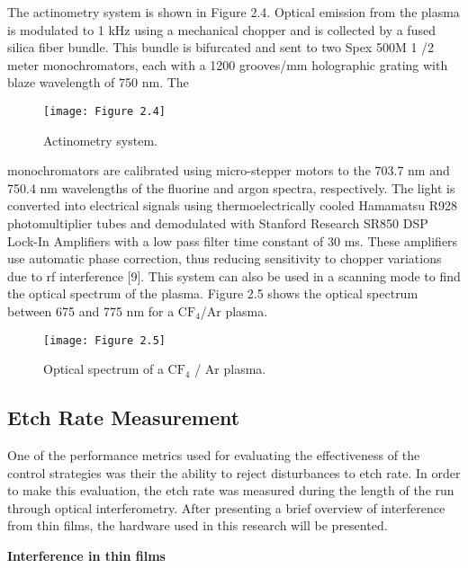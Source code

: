 The actinometry system is shown in Figure 2.4. Optical emission from the plasma is
modulated to 1 kHz using a mechanical chopper and is collected by a fused silica fiber
bundle. This bundle is bifurcated and sent to two Spex 500M 1 /2 meter monochromators,
each with a 1200 grooves/mm holographic grating with blaze wavelength of 750 nm. The


\begin{figure}[H]
	\centering
	\texttt{[image: Figure 2.4]}
	\bf\caption{ Actinometry system.}
	\label{fig:2.4}
\end{figure}


\noindent monochromators are calibrated using micro-stepper motors to the 703.7 nm and 750.4 nm
wavelengths of the fluorine and argon spectra, respectively. The light is converted into
electrical signals using thermoelectrically cooled Hamamatsu R928 photomultiplier tubes
and demodulated with Stanford Research SR850 DSP Lock-In Amplifiers with a low pass
filter time constant of 30 ms. These amplifiers use automatic phase correction, thus reducing
sensitivity to chopper variations due to rf interference [9]. This system can also be used in
a scanning mode to find the optical spectrum of the plasma. Figure 2.5 shows the optical
spectrum between 675 and 775 nm for a $\text{CF}_{4}$/Ar plasma.

\begin{figure}[H]
	\centering
	\texttt{[image: Figure 2.5]}
	\bf\caption{ Optical spectrum of a $\text{CF}_{4}$ / Ar plasma.}
	\label{fig:2.5}
\end{figure}


\subsection{Etch Rate Measurement}

\tab One of the performance metrics used for evaluating the effectiveness of the control
strategies was their the ability to reject disturbances to etch rate. In order to make this
evaluation, the etch rate was measured during the length of the run through optical interferometry. After presenting a brief overview of interference from thin films, the hardware
used in this research will be presented.

\noindent\large\bf Interference in thin films

